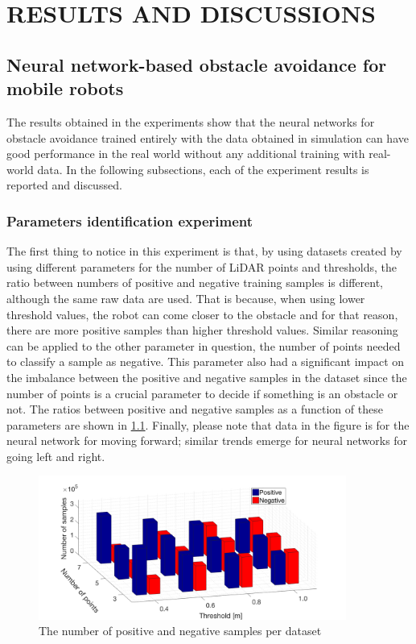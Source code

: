 \chapter{RESULTS AND DISCUSSIONS}
\label{chap:Results}

\section{Neural network-based obstacle avoidance for mobile robots}

The results obtained in the experiments show that the neural networks for obstacle avoidance trained entirely with the data obtained in simulation can have good performance in the real world without any additional training with real-world data. In the following subsections, each of the experiment results is reported and discussed.

\subsection{Parameters identification experiment}\label{Sec:ResLabelling}

The first thing to notice in this experiment is that, by using datasets created by using different parameters for the number of LiDAR points and thresholds, the ratio between numbers of positive and negative training samples is different, although the same raw data are used. That is because, when using lower threshold values, the robot can come closer to the obstacle and for that reason, there are more positive samples than higher threshold values. Similar reasoning can be applied to the other parameter in question, the number of points needed to classify a sample as negative. This parameter also had a significant impact on the imbalance between the positive and negative samples in the dataset since the number of points is a crucial parameter to decide if something is an obstacle or not. The ratios between positive and negative samples as a function of these parameters are shown in \cref{fig:Brojevi}. Finally, please note that data in the figure is for the neural network for moving forward; similar trends emerge for neural networks for going left and right.

\begin{figure}
\centering
\includegraphics[width=0.9\textwidth]{slike/brojevi}
\caption{The number of positive and negative samples per dataset}
\label{fig:Brojevi}
\end{figure}

